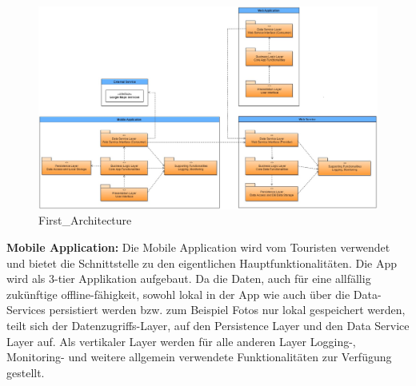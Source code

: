 \documentclass[a4paper,10pt,xetex]{article}
\begin{document}
\begin{figure}
\centering
\includegraphics{first_architecture1.jpg}
\caption{First\_Architecture}
\end{figure}

\textbf{Mobile Application:} Die Mobile Application wird vom Touristen
verwendet und bietet die Schnittstelle zu den eigentlichen
Hauptfunktionalitäten. Die App wird als 3-tier Applikation aufgebaut. Da
die Daten, auch für eine allfällig zukünftige offline-fähigkeit, sowohl
lokal in der App wie auch über die Data-Services persistiert werden bzw.
zum Beispiel Fotos nur lokal gespeichert werden, teilt sich der
Datenzugriffs-Layer, auf den Persistence Layer und den Data Service
Layer auf. Als vertikaler Layer werden für alle anderen Layer Logging-,
Monitoring- und weitere allgemein verwendete Funktionalitäten zur
Verfügung gestellt.
\end{document}
